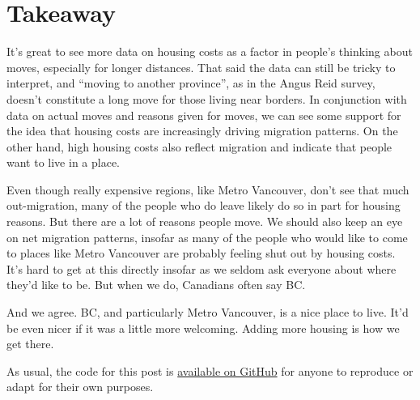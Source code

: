 \documentclass[
  letterpaper,
]{article}
\begin{document}
\section{Takeaway}\label{takeaway}

It's great to see more data on housing costs as a factor in people's
thinking about moves, especially for longer distances. That said the
data can still be tricky to interpret, and ``moving to another
province'', as in the Angus Reid survey, doesn't constitute a long move
for those living near borders. In conjunction with data on actual moves
and reasons given for moves, we can see some support for the idea that
housing costs are increasingly driving migration patterns. On the other
hand, high housing costs also reflect migration and indicate that people
want to live in a place.

Even though really expensive regions, like Metro Vancouver, don't see
that much out-migration, many of the people who do leave likely do so in
part for housing reasons. But there are a lot of reasons people move. We
should also keep an eye on net migration patterns, insofar as many of
the people who would like to come to places like Metro Vancouver are
probably feeling shut out by housing costs. It's hard to get at this
directly insofar as we seldom ask everyone about where they'd like to
be. But when we do, Canadians often say BC.

And we agree. BC, and particularly Metro Vancouver, is a nice place to
live. It'd be even nicer if it was a little more welcoming. Adding more
housing is how we get there.

As usual, the code for this post is
\href{https://github.com/mountainMath/mountain_doodles/blob/main/posts/2024-06-11-migration-and-housing-costs/index.qmd}{available
on GitHub} for anyone to reproduce or adapt for their own purposes.
\end{document}
